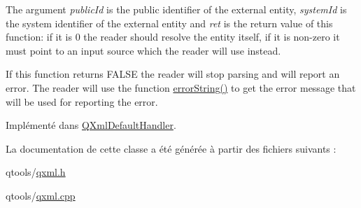 The argument {\itshape public\+Id} is the public identifier of the external entity, {\itshape system\+Id} is the system identifier of the external entity and {\itshape ret} is the return value of this function\+: if it is 0 the reader should resolve the entity itself, if it is non-\/zero it must point to an input source which the reader will use instead.

If this function returns F\+A\+L\+S\+E the reader will stop parsing and will report an error. The reader will use the function \hyperlink{class_q_xml_entity_resolver_a3f190a7cd80a8faa3df903f963709370}{error\+String()} to get the error message that will be used for reporting the error. 

Implémenté dans \hyperlink{class_q_xml_default_handler_ac2fa1a7aff599d2832fca1d650a435a7}{Q\+Xml\+Default\+Handler}.



La documentation de cette classe a été générée à partir des fichiers suivants \+:\begin{DoxyCompactItemize}
\item 
qtools/\hyperlink{qxml_8h}{qxml.\+h}\item 
qtools/\hyperlink{qxml_8cpp}{qxml.\+cpp}\end{DoxyCompactItemize}

